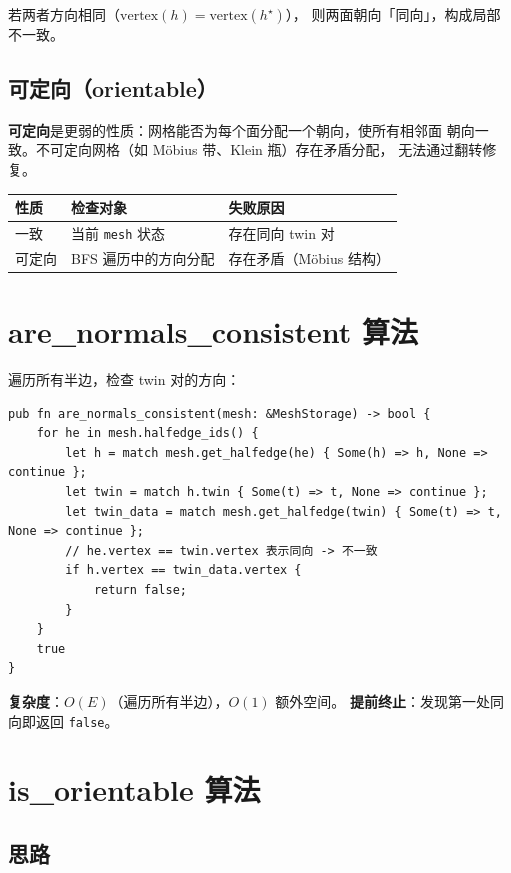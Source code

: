 \documentclass[11pt,a4paper]{article}
\begin{document}
若两者方向相同（$\mathrm{vertex}(h) = \mathrm{vertex}(h^\star)$），
则两面朝向「同向」，构成局部不一致。

\subsection{可定向（orientable）}

\textbf{可定向}是更弱的性质：网格能否为每个面分配一个朝向，使所有相邻面
朝向一致。不可定向网格（如 Möbius 带、Klein 瓶）存在矛盾分配，
无法通过翻转修复。

\begin{center}
\renewcommand{\arraystretch}{1.18}
\begin{tabular}{@{}lll@{}}
  \toprule
  \textbf{性质} & \textbf{检查对象} & \textbf{失败原因} \\
  \midrule
  一致  & 当前 \texttt{mesh} 状态       & 存在同向 twin 对 \\
  可定向 & BFS 遍历中的方向分配          & 存在矛盾（Möbius 结构） \\
  \bottomrule
\end{tabular}
\end{center}

\section{are\_normals\_consistent 算法}

遍历所有半边，检查 twin 对的方向：

\begin{lstlisting}
pub fn are_normals_consistent(mesh: &MeshStorage) -> bool {
    for he in mesh.halfedge_ids() {
        let h = match mesh.get_halfedge(he) { Some(h) => h, None => continue };
        let twin = match h.twin { Some(t) => t, None => continue };
        let twin_data = match mesh.get_halfedge(twin) { Some(t) => t, None => continue };
        // he.vertex == twin.vertex 表示同向 -> 不一致
        if h.vertex == twin_data.vertex {
            return false;
        }
    }
    true
}
\end{lstlisting}

\textbf{复杂度}：$O(E)$（遍历所有半边），$O(1)$ 额外空间。
\textbf{提前终止}：发现第一处同向即返回 \texttt{false}。

\section{is\_orientable 算法}

\subsection{思路}
\end{document}
